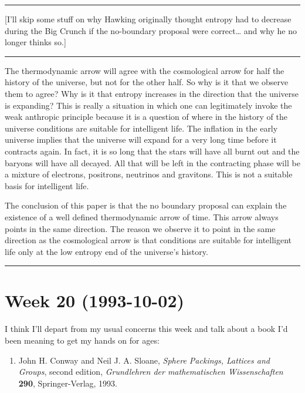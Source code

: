 \documentclass{article}
\def\tightlist{}
\begin{document}
\begin{center}\rule{0.5\linewidth}{0.5pt}\end{center}

{[}I'll skip some stuff on why Hawking originally thought entropy had to
decrease during the Big Crunch if the no-boundary proposal were
correct\ldots{} and why he no longer thinks so.{]}

\begin{center}\rule{0.5\linewidth}{0.5pt}\end{center}

The thermodynamic arrow will agree with the cosmological arrow for half
the history of the universe, but not for the other half. So why is it
that we observe them to agree? Why is it that entropy increases in the
direction that the universe is expanding? This is really a situation in
which one can legitimately invoke the weak anthropic principle because
it is a question of where in the history of the universe conditions are
suitable for intelligent life. The inflation in the early universe
implies that the universe will expand for a very long time before it
contracts again. In fact, it is so long that the stars will have all
burnt out and the baryons will have all decayed. All that will be left
in the contracting phase will be a mixture of electrons, positrons,
neutrinos and gravitons. This is not a suitable basis for intelligent
life.

The conclusion of this paper is that the no boundary proposal can
explain the existence of a well defined thermodynamic arrow of time.
This arrow always points in the same direction. The reason we observe it
to point in the same direction as the cosmological arrow is that
conditions are suitable for intelligent life only at the low entropy end
of the universe's history.

\begin{center}\rule{0.5\linewidth}{0.5pt}\end{center}
\hypertarget{week-20-1993-10-02}{%
\section{Week 20 (1993-10-02)}\label{week-20-1993-10-02}}

I think I'll depart from my usual concerns this week and talk about a
book I'd been meaning to get my hands on for ages:

\begin{enumerate}
\def\labelenumi{\arabic{enumi})}
\tightlist
\item
  John H. Conway and Neil J. A. Sloane, \emph{Sphere Packings, Lattices
  and Groups}, second edition, \emph{Grundlehren der mathematischen
  Wissenschaften} \textbf{290}, Springer-Verlag, 1993.
\end{enumerate}
\end{document}
